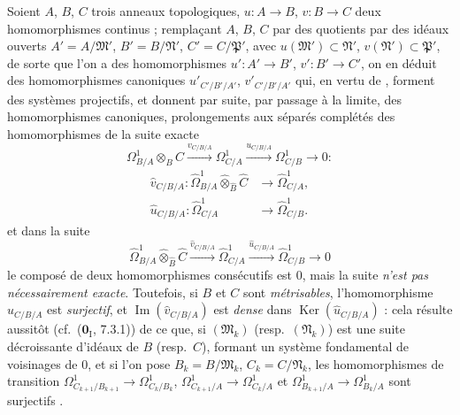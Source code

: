 \begin{env}[20.7.17]
\label{0.20.7.17-fr}
Soient $A$, $B$, $C$ trois anneaux topologiques, $u:A\to B$, $v:B\to C$ deux
homomorphismes continus ; remplaçant $A$, $B$, $C$ par des quotients par des
idéaux ouverts $A'=A/\mathfrak{M}'$, $B'=B/\mathfrak{N}'$,
$C'=C/\mathfrak{P}'$, avec $u(\mathfrak{M}')\subset\mathfrak{N}'$,
$v(\mathfrak{N}')\subset\mathfrak{P}'$, de sorte que l'on a des
homomorphismes $u':A'\to B'$, $v':B'\to C'$, on en déduit des homomorphismes
canoniques $u'_{C'/B'/A'}$, $v'_{C'/B'/A'}$ qui, en vertu de
, forment des systèmes projectifs, et donnent par suite,
par passage à la limite, des homomorphismes canoniques, prolongements aux
séparés complétés des homomorphismes de la suite exacte
\[
  \Omega^1_{B/A}\otimes_B C\xrightarrow{v_{C/B/A}}\Omega^1_{C/A}
  \xrightarrow{u_{C/B/A}}\Omega^1_{C/B}\to0:
\]
\begin{align}
  \widehat v_{C/B/A}:\widehat{\Omega}^1_{B/A}
  \widehat\otimes_{\widehat B}\widehat C&\to\widehat{\Omega}^1_{C/A},
  \tag{20.7.17.1}\label{0.20.7.17.1-fr}\\
  \widehat u_{C/B/A}:\widehat{\Omega}^1_{C/A}&\to
  \widehat{\Omega}^1_{C/B}. \tag{20.7.17.2}\label{0.20.7.17.2-fr}
\end{align}
et dans la suite
\begin{equation}
\tag{20.7.17.3}
\label{0.20.7.17.3-fr}
  \widehat{\Omega}^1_{B/A}\widehat\otimes_{\widehat B}\widehat C
  \xrightarrow{\widehat v_{C/B/A}}\widehat{\Omega}^1_{C/A}
  \xrightarrow{\widehat u_{C/B/A}}\widehat{\Omega}^1_{C/B}\to0
\end{equation}
le composé de deux homomorphismes consécutifs est $0$, mais la suite
\emph{n'est pas nécessairement exacte}. Toutefois, si $B$ et $C$ sont
\emph{métrisables}, l'homomorphisme $\widehat u_{C/B/A}$ est \emph{surjectif},
et $\operatorname{Im}(\widehat v_{C/B/A})$ est \emph{dense} dans
$\operatorname{Ker}(\widehat u_{C/B/A})$ : cela résulte aussitôt
(cf.\ ($\mathbf{0}_{\mathrm I}$, 7.3.1)) de ce que, si
$(\mathfrak{M}_k)$ (resp.\ $(\mathfrak{N}_k)$) est une suite décroissante
d'idéaux de $B$ (resp.\ $C$), formant un système fondamental de voisinages de
$0$, et si l'on pose $B_k=B/\mathfrak{M}_k$, $C_k=C/\mathfrak{N}_k$, les
homomorphismes de transition
$\Omega^1_{C_{k+1}/B_{k+1}}\to\Omega^1_{C_k/B_k}$,
$\Omega^1_{C_{k+1}/A}\to\Omega^1_{C_k/A}$ et
$\Omega^1_{B_{k+1}/A}\to\Omega^1_{B_k/A}$ sont surjectifs
.
\end{env}

